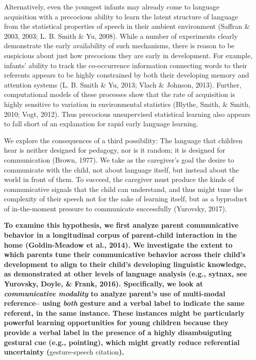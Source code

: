 \documentclass[10pt, letterpaper]{article}
\begin{document}
Alternatively, even the youngest infants may already come to language
acquisition with a precocious ability to learn the latent structure of
language from the statistical properties of speech in their ambient
environment (Saffran \& 2003, 2003; L. B. Smith \& Yu, 2008). While a
number of experiments clearly demonstrate the early availability of such
mechanisms, there is reason to be suspicious about just how precocious
they are early in development. For example, infants' ability to track
the co-occurrence information connecting words to their referents
appears to be highly constrained by both their developing memory and
attention systems (L. B. Smith \& Yu, 2013; Vlach \& Johnson, 2013).
Further, computational models of these processes show that the rate of
acquisition is highly sensitive to variation in environmental statistics
(Blythe, Smith, \& Smith, 2010; Vogt, 2012). Thus precocious
unsupervised statistical learning also appears to fall short of an
explanation for rapid early language learning.

We explore the consequences of a third possibility: The language that
children hear is neither designed for pedagogy, nor is it random; it is
designed for communication (Brown, 1977). We take as the caregiver's
goal the desire to communicate with the child, not about language
itself, but instead about the world in front of them. To succeed, the
caregiver must produce the kinds of communicative signals that the child
can understand, and thus might tune the complexity of their speech not
for the sake of learning itself, but as a byproduct of in-the-moment
pressure to communicate successfully (Yurovsky, 2017).

\textbf{To examine this hypothesis, we first analyze parent
communicative behavior in a longitudinal corpus of parent-child
interaction in the home (Goldin-Meadow et al., 2014). We investigate the
extent to which parents tune their communicative behavior across their
child's development to align to their child's developing linguistic
knowledge, as demonstrated at other levels of language analysis (e.g.,
sytnax, see Yurovsky, Doyle, \& Frank, 2016). Specifically, we look at
\emph{communicative modality} to analyze parent's use of multi-modal
reference-- using \emph{both} gesture and a verbal label to indicate the
same referent, in the same instance. These instances might be
particularly powerful learning opportunities for young children because
they provide a verbal label in the presence of a highly disambuiguting
gestural cue (e.g., pointing), which might greatly reduce referential
uncertainty (}gesture-speech citation\textbf{).}
\end{document}
